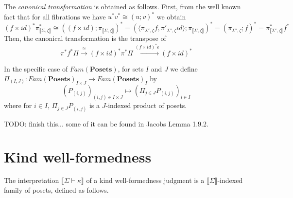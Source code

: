 \documentclass{article}
\newcommand{\sem}[1]{\llbracket #1 \rrbracket}
\begin{document}
The \emph{canonical transformation} is obtained as follows. First, from the well known fact that for all fibrations we have $u^*v^* \cong (u;v)^*$ we obtain $$(f \times \mathit{id})^*\pi^*_{\sem{\Sigma,\zeta}} \cong ((f \times \mathit{id});\pi_{\sem{\Sigma,\zeta}})^* = (\langle \pi_{\Sigma',\zeta} f, \pi'_{\Sigma',\zeta} \mathit{id} \rangle;\pi_{\sem{\Sigma,\zeta}})^* = (\pi_{\Sigma',\zeta};f)^* = \pi_{\sem{\Sigma',\zeta}}^* f^*$$
Then, the canonical transformation is the transpose of 
$$\pi^* f^* \Pi \overset{\cong}{\longrightarrow} (f \times \mathit{id})^* \pi^* \Pi \overset{(f \times \mathit{id})^* \epsilon}{\longrightarrow} (f \times \mathit{id})^*$$

In the specific case of $\mathit{Fam}(\mathbf{Posets})$, for sets $I$ and $J$ we define $\Pi_{(I,J)} : \mathit{Fam}(\mathbf{Posets})_{I \times J} \to \mathit{Fam}(\mathbf{Posets})_I$ by
$$(P_{(i,j)})_{(i,j) \in I \times J} \mapsto (\Pi_{j \in J} P_{(i,j)})_{i \in I}$$  
where for $i \in I$, $\Pi_{j \in J} P_{(i,j)}$ is a $J$-indexed product of posets.

TODO: finish this... some of it can be found in Jacobs Lemma 1.9.2.

\section*{Kind well-formedness}


The interpretation $\sem{\Sigma \vdash \kappa}$ of a kind well-formedness judgment is a $\sem{\Sigma}$-indexed family of posets, defined as follows.
\end{document}
